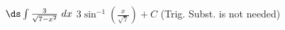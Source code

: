 {$\ds \int \frac3{\sqrt{7-x^2}}\ dx$
}
{$3\sin^{-1}\left(\frac{x}{\sqrt{7}}\right)+C$ (Trig. Subst. is not needed)
}
